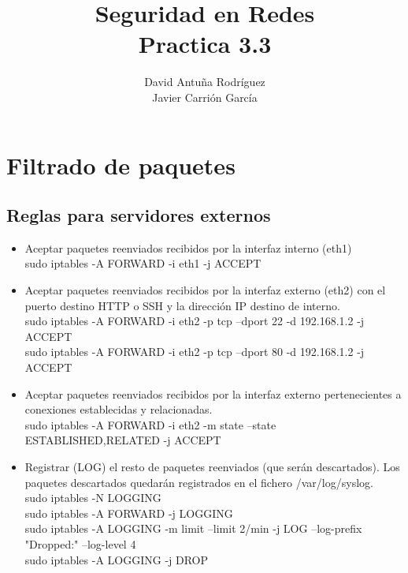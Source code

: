 \documentclass[11pt]{article}
\title{\Large Seguridad en Redes\\Practica 3.3}
\author{David Antuña Rodríguez\\Javier Carrión García}
\date{}
\begin{document}
  \raggedright

  \maketitle
  \newpage

  \section{Filtrado de paquetes}
    \subsection{Reglas para servidores externos}
      \begin{itemize}
        \item Aceptar paquetes reenviados recibidos por la interfaz interno
          (eth1)\\
          \vspace{2mm}
          sudo iptables -A FORWARD -i eth1 -j ACCEPT
        \item Aceptar paquetes reenviados recibidos por la interfaz externo
          (eth2) con el puerto destino HTTP o SSH y la dirección IP destino de
          interno.\\
          \vspace{2mm}
          sudo iptables -A FORWARD -i eth2 -p tcp --dport 22 -d 192.168.1.2 -j
            ACCEPT\\
          sudo iptables -A FORWARD -i eth2 -p tcp --dport 80 -d 192.168.1.2 -j
            ACCEPT
        \item Aceptar paquetes reenviados recibidos por la interfaz externo
          pertenecientes a conexiones establecidas y relacionadas.\\
          \vspace{2mm}
          sudo iptables -A FORWARD -i eth2 -m state --state ESTABLISHED,RELATED
            -j ACCEPT\\
        \item Registrar (LOG) el resto de paquetes reenviados (que serán
          descartados). Los paquetes descartados quedarán registrados en el
          fichero /var/log/syslog.\\
          \vspace{2mm}
          sudo iptables -N LOGGING\\
          sudo iptables -A FORWARD -j LOGGING\\
          sudo iptables -A LOGGING -m limit --limit 2/min -j LOG --log-prefix
            "Dropped:" --log-level 4\\
          sudo iptables -A LOGGING -j DROP
      \end{itemize}
\end{document}
